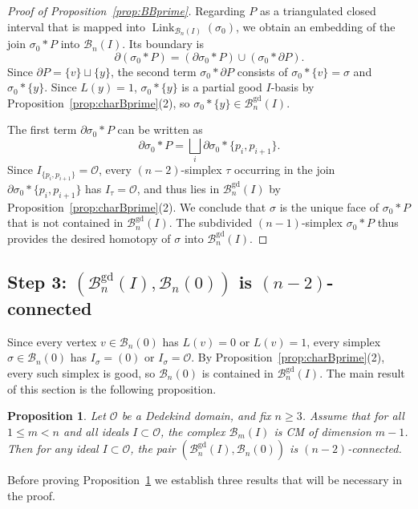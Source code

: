 \documentclass[11 pt]{article}
\theoremstyle{plain}
\newtheorem{proposition}[theorem]{Proposition}
\theoremstyle{definition}
\numberwithin{equation}{section}
\renewcommand{\O}{\mathcal{O}}
\newcommand\PartialBases{\ensuremath{\mathcal{B}}}
\newcommand{\PB}{\PartialBases}
\newcommand{\PartialBasesGood}{\PartialBases^{\text{gd}}}
\newcommand{\PBg}{\PartialBasesGood}
\DeclareMathOperator{\Link}{Link}
\begin{document}
\begin{proof}[Proof of Proposition~\ref{prop:BBprime}]
Regarding $P$ as a triangulated closed interval that is mapped into $\Link_{\PartialBases_n(I)}(\sigma_0)$, 
we obtain an embedding of the join $\sigma_0 \ast P$ into $\PartialBases_n(I)$.  Its boundary is
\[\partial(\sigma_0\ast P)=\left(\partial \sigma_0\ast P\right) \cup \left(\sigma_0\ast \partial P\right).\]
Since $\partial P=\{v\}\sqcup \{y\}$, the second term $\sigma_0\ast\partial P$ consists of $\sigma_0 \ast \{v\}=\sigma$ 
and $\sigma_0 \ast \{y\}$.  Since $L(y)=1$, $\sigma_0\ast\{y\}$ is a partial good $I$-basis by Proposition~\ref{prop:charBprime}(2), so $\sigma_0\ast \{y\}\in\PartialBasesGood_n(I)$.

The first term $\partial\sigma_0 \ast P$ can be written as 
\[\partial \sigma_0\ast P = \bigsqcup_i \partial \sigma_0 \ast \{p_i,p_{i+1}\}.\]
Since $I_{\{p_i,p_{i+1}\}}=\O$, every $(n-2)$-simplex $\tau$ occurring in the join $\partial \sigma_0 \ast \{p_i,p_{i+1}\}$ 
has $I_\tau=\O$, and thus lies in $\PartialBasesGood_n(I)$ by Proposition~\ref{prop:charBprime}(2).  We conclude that $\sigma$ 
is the unique face of $\sigma_0\ast P$ that is not contained in $\PartialBasesGood_n(I)$.  The subdivided $(n-1)$-simplex 
$\sigma_0 \ast P$ thus provides the desired homotopy of $\sigma$ into $\PartialBasesGood_n(I)$.
\end{proof}

\subsection{Step 3: \texorpdfstring{$(\PBg_n(I),\PB_n(0))$}{(Bn-good(I),Bn(0))} is \texorpdfstring{$(n-2)$-connected}{(n-2)-connected}}
\label{section:step3}

Since every vertex $v\in \PB_n(0)$ has $L(v)=0$ or $L(v)=1$, every simplex $\sigma\in \PB_n(0)$ has $I_\sigma=(0)$ or $I_\sigma=\O$. By Proposition~\ref{prop:charBprime}(2), every such simplex is good, so $\PB_n(0)$ is contained in $\PBg_n(I)$.
The main result of this section is the following proposition. 

\begin{proposition}
\label{prop:BprimeB0}
Let $\O$ be a Dedekind domain, and fix $n\geq 3$. Assume that for all $1\leq m<n$ and all ideals $I\subset \O$, the complex $\PB_m(I)$ is CM of dimension $m-1$. Then for any ideal $I\subset \O$, the pair $(\PBg_n(I),\PB_n(0))$ is $(n-2)$-connected.
\end{proposition}
\noindent Before proving Proposition~\ref{prop:BprimeB0} we establish three results that will be necessary in the proof.
\end{document}
